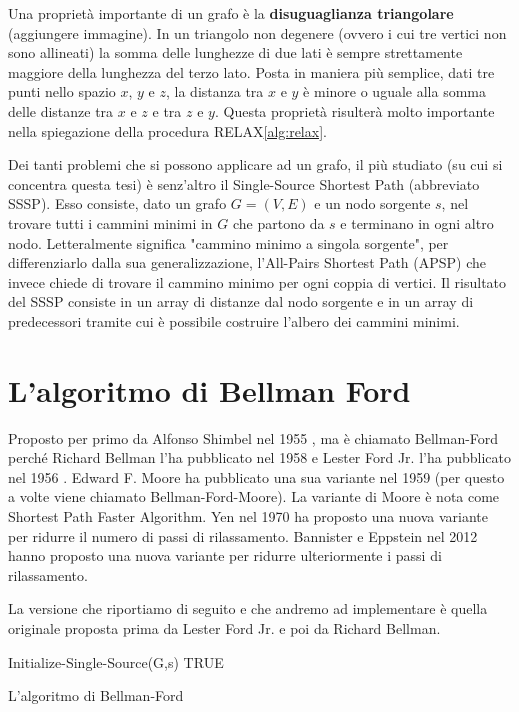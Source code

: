\documentclass[12pt,a4paper]{book}
\begin{document}
	Una proprietà importante di un grafo è la \textbf{disuguaglianza triangolare} (aggiungere immagine). In un triangolo non degenere (ovvero i cui tre vertici non sono allineati) la somma delle lunghezze di due lati è sempre strettamente maggiore della lunghezza del terzo lato. Posta in maniera più semplice, dati tre punti nello spazio $x$, $y$ e $z$, la distanza tra $x$ e $y$ è minore o uguale alla somma delle distanze tra $x$ e $z$ e tra $z$ e $y$. Questa proprietà risulterà molto importante nella spiegazione della procedura RELAX\ref{alg:relax}.
	
	Dei tanti problemi che si possono applicare ad un grafo, il più studiato (su cui si concentra questa tesi) è senz'altro il Single-Source Shortest Path (abbreviato SSSP). Esso consiste, dato un grafo $G=(V,E)$ e un nodo sorgente $s$, nel trovare tutti i cammini minimi in $G$ che partono da $s$ e terminano in ogni altro nodo. Letteralmente significa "cammino minimo a singola sorgente", per differenziarlo dalla sua generalizzazione, l'All-Pairs Shortest Path (APSP) che invece chiede di trovare il cammino minimo per ogni coppia di vertici. Il risultato del SSSP consiste in un array di distanze dal nodo sorgente e in un array di predecessori tramite cui è possibile costruire l'albero dei cammini minimi.
	
	\chapter{L'algoritmo di Bellman Ford}
	\label{section:analisi}
	Proposto per primo da Alfonso Shimbel nel 1955 \cite{Shimbel1955}, ma è chiamato Bellman-Ford perché Richard Bellman l'ha pubblicato nel 1958 \cite{Bellman1958} e Lester Ford Jr. l'ha pubblicato nel 1956 \cite{Ford1956}. Edward F. Moore ha pubblicato una sua variante nel 1959 \cite{Moore1959} (per questo a volte viene chiamato Bellman-Ford-Moore). La variante di Moore è nota come Shortest Path Faster Algorithm. Yen nel 1970 \cite{Yen1970} ha proposto una nuova variante per ridurre il numero di passi di rilassamento. Bannister e Eppstein nel 2012 \cite{Bannister2012} hanno proposto una nuova variante per ridurre ulteriormente i passi di rilassamento.
	
	La versione che riportiamo di seguito e che andremo ad implementare è quella originale proposta prima da Lester Ford Jr. e poi da Richard Bellman.
	
	\begin{algorithm}[H]
		\label{alg:bf}
		Initialize-Single-Source(G,s)\;
		\Return TRUE\;
		\caption{L'algoritmo di Bellman-Ford}
	\end{algorithm}
\end{document}
